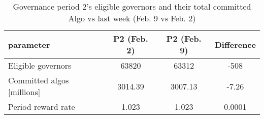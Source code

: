 %
\begin{longtable}[c]{ l c c c }
\caption{Governance period 2's eligible governors and their total committed Algo vs last week (Feb. 9 vs Feb. 2)} \\
\hline
\textbf{parameter} & \textbf{P2 (Feb. 2)} & \textbf{P2 (Feb. 9)} & \textbf{Difference} \\
\hline

Eligible governors & 63820 & 63312 & -508 \\
Committed algos [millions] & 3014.39 & 3007.13 & -7.26 \\
Period reward rate & 1.023 & 1.023 & 0.0001 \\
\hline
\end{longtable} 
